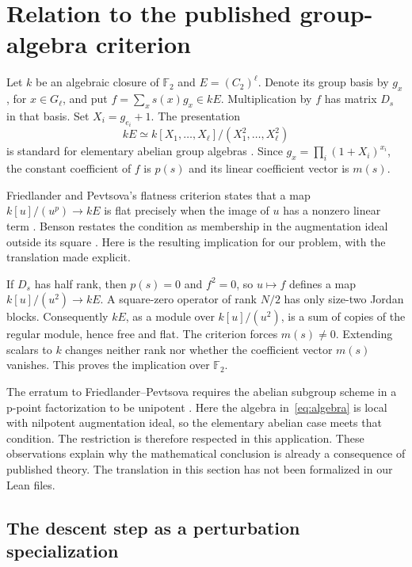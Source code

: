 \documentclass[11pt]{article}
\theoremstyle{definition}
\newcommand{\F}{\mathbb F_2}
\begin{document}
\section{Relation to the published group-algebra criterion}\label{sec:group}

Let $k$ be an algebraic closure of $\F$ and $E=(C_2)^\ell$. Denote its group basis by $g_x$, for $x\in G_\ell$, and put $f=\sum_xs(x)g_x\in kE$. Multiplication by $f$ has matrix $D_s$ in that basis. Set $X_i=g_{e_i}+1$. The presentation
\begin{equation}\label{eq:algebra}
 kE\simeq k[X_1,\ldots,X_\ell]/(X_1^2,\ldots,X_\ell^2)
\end{equation}
is standard for elementary abelian group algebras \cite[Section~1.3]{benson}. Since $g_x=\prod_i(1+X_i)^{x_i}$, the constant coefficient of $f$ is $p(s)$ and its linear coefficient vector is $m(s)$.

Friedlander and Pevtsova's flatness criterion states that a map $k[u]/(u^p)\to kE$ is flat precisely when the image of $u$ has a nonzero linear term \cite[Example~2.6; author manuscript p.~11]{fp}. Benson restates the condition as membership in the augmentation ideal outside its square \cite[Section~1.4, p.~6]{benson}. Here is the resulting implication for our problem, with the translation made explicit.

If $D_s$ has half rank, then $p(s)=0$ and $f^2=0$, so $u\mapsto f$ defines a map $k[u]/(u^2)\to kE$. A square-zero operator of rank $N/2$ has only size-two Jordan blocks. Consequently $kE$, as a module over $k[u]/(u^2)$, is a sum of copies of the regular module, hence free and flat. The criterion forces $m(s)\ne0$. Extending scalars to $k$ changes neither rank nor whether the coefficient vector $m(s)$ vanishes. This proves the implication over $\F$.

The erratum to Friedlander--Pevtsova requires the abelian subgroup scheme in a p-point factorization to be unipotent \cite{fperr}. Here the algebra in~\eqref{eq:algebra} is local with nilpotent augmentation ideal, so the elementary abelian case meets that condition. The restriction is therefore respected in this application. These observations explain why the mathematical conclusion is already a consequence of published theory. The translation in this section has not been formalized in our Lean files.

\subsection{The descent step as a perturbation specialization}\label{sec:perturbation}
\end{document}
